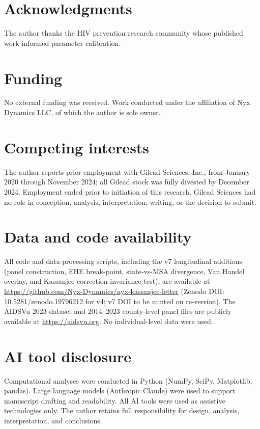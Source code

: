 \documentclass[12pt]{article}
\begin{document}
\section*{Acknowledgments}

The author thanks the HIV prevention research community whose published work informed parameter calibration.

\section*{Funding}

No external funding was received. Work conducted under the affiliation of Nyx Dynamics LLC, of which the author is sole owner.

\section*{Competing interests}

The author reports prior employment with Gilead Sciences, Inc., from January 2020 through November 2024; all Gilead stock was fully divested by December 2024. Employment ended prior to initiation of this research. Gilead Sciences had no role in conception, analysis, interpretation, writing, or the decision to submit.

\section*{Data and code availability}

All code and data-processing scripts, including the v7 longitudinal additions (panel construction, EHE break-point, state-vs-MSA divergence, Van Handel overlay, and Kassanjee correction invariance test), are available at \url{https://github.com/Nyx-Dynamics/nyx-kassanjee-letter} (Zenodo DOI: 10.5281/zenodo.19796212 for v4; v7 DOI to be minted on re-version). The AIDSVu 2023 dataset and 2014--2023 county-level panel files are publicly available at \url{https://aidsvu.org}. No individual-level data were used.

\section*{AI tool disclosure}

Computational analyses were conducted in Python (NumPy, SciPy, Matplotlib, pandas). Large language models (Anthropic Claude) were used to support manuscript drafting and readability. All AI tools were used as assistive technologies only. The author retains full responsibility for design, analysis, interpretation, and conclusions.
\end{document}
